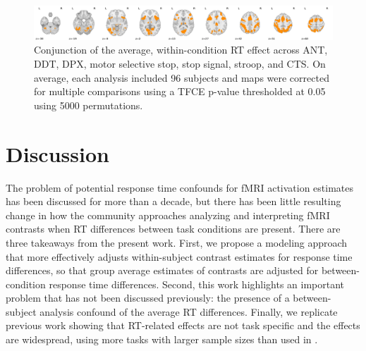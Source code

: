 \documentclass[titlepage,12pt] {article}
\begin{document}
\begin{figure}
  \centering
   \includegraphics[width=6.5in]{Figures/conjunction_avg_rt_effect_across_7tasks.pdf}
   \caption{Conjunction of the average, within-condition RT effect across ANT, DDT, DPX, motor selective stop, stop signal, stroop, and CTS.  On average, each analysis included 96 subjects and maps were corrected for multiple comparisons using a TFCE p-value thresholded at 0.05 using 5000 permutations.}
  \label{fig:conj}
\end{figure}




\section*{Discussion}

The problem of potential response time confounds for fMRI activation estimates has been discussed for more than a decade, but there has been little resulting change in how the community approaches analyzing and interpreting fMRI contrasts when RT differences between task conditions are present.  There are three takeaways from the present work.  First, we propose a modeling approach that more effectively adjusts within-subject contrast estimates for response time differences, so that group average estimates of contrasts are adjusted for between-condition response time differences.  Second, this work highlights an important problem that has not been discussed previously: 
the presence of a between-subject analysis confound of the average RT differences.  Finally, we replicate previous work showing that RT-related effects are not task specific and the effects are widespread, using more tasks with larger sample sizes than used in \citet{yarkoni_bold_2009}.
\end{document}
